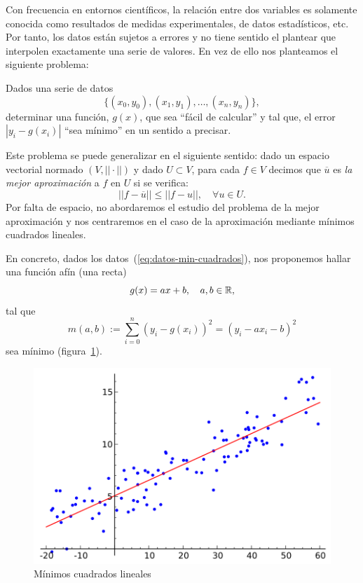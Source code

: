  Con frecuencia en entornos científicos, la relación entre dos
 variables es solamente conocida como resultados de medidas
 experimentales, de datos estadísticos, etc. Por tanto, los datos están
 sujetos a errores y no tiene sentido el plantear que interpolen
 exactamente una serie de valores. En vez de ello nos planteamos el
 siguiente problema:

 Dados una serie de datos 
 \begin{equation}
   \{(x_0,y_0),(x_1,y_1),\dots,(x_n,y_n)\}, 
   \label{eq:datos-min-cuadrados}
 \end{equation}
 determinar una función, $g(x)$, que sea ``fácil de calcular'' y tal
 que, el error $|y_i-g(x_i)|$ ``sea mínimo'' en un sentido a precisar.

 Este problema se puede generalizar en el siguiente sentido: dado un espacio
 vectorial normado $(V,||\cdot||)$ y dado $U\subset V$, para cada $f\in
 V$ decimos que $\overline u$ es \textit{la mejor aproximación} a $f$
 en $U$ si se verifica:
 \begin{equation*}
   ||f-\overline u|| \le ||f-u||, \quad \forall u\in U.
 \end{equation*}
 Por falta de espacio, no abordaremos el estudio del problema de la
 mejor aproximación y nos centraremos en el caso de la 
 aproximación mediante mínimos cuadrados lineales.

 En concreto, dados los datos~(\ref{eq:datos-min-cuadrados}), nos
 proponemos hallar una función afín (una recta)
 \begin{equation}
   g(x)=ax+b, \quad a,b\in\operatorname{{\mathbb R}},\label{eq:5}
 \end{equation}
 tal que
 \begin{equation*}
   m(a,b) := \sum_{i=0}^n
   \left(
     y_i - g(x_i)
   \right)^2
   =
   \left(
     y_i - a x_i - b
   \right)^2
 \end{equation*}
 sea mínimo (figura~\ref{fig:min-cuadrados-lineales}).

 \begin{figure}
   \centering
   \includegraphics[width=0.6\linewidth]{tema2/linear_regression}
   \caption{Mínimos cuadrados lineales}
   \label{fig:min-cuadrados-lineales}
 \end{figure}

